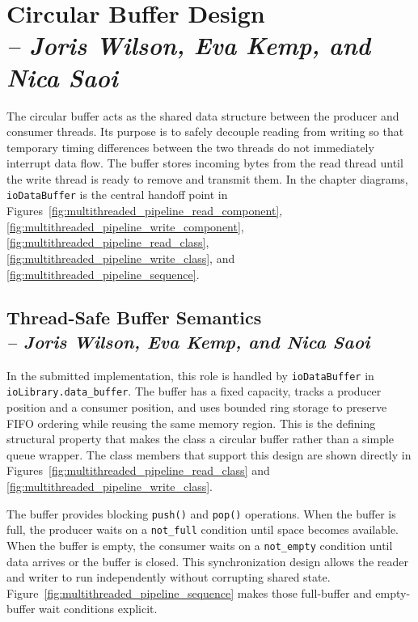 \section{Circular Buffer Design \\
\small{\textit{-- Joris Wilson, Eva Kemp, and Nica Saoi}}}
\label{Section::Circular Buffer Design}

The circular buffer acts as the shared data structure between the producer and consumer threads. Its purpose is to safely decouple reading from writing so that temporary timing differences between the two threads do not immediately interrupt data flow. The buffer stores incoming bytes from the read thread until the write thread is ready to remove and transmit them. In the chapter diagrams, \texttt{ioDataBuffer} is the central handoff point in Figures~\ref{fig:multithreaded_pipeline_read_component}, \ref{fig:multithreaded_pipeline_write_component}, \ref{fig:multithreaded_pipeline_read_class}, \ref{fig:multithreaded_pipeline_write_class}, and \ref{fig:multithreaded_pipeline_sequence}.

\subsection{Thread-Safe Buffer Semantics \\
\small{\textit{-- Joris Wilson, Eva Kemp, and Nica Saoi}}}
\label{Section::Thread-Safe Buffer Semantics}

In the submitted implementation, this role is handled by \texttt{ioDataBuffer} in \texttt{ioLibrary.data\_buffer}. The buffer has a fixed capacity, tracks a producer position and a consumer position, and uses bounded ring storage to preserve FIFO ordering while reusing the same memory region. This is the defining structural property that makes the class a circular buffer rather than a simple queue wrapper. The class members that support this design are shown directly in Figures~\ref{fig:multithreaded_pipeline_read_class} and \ref{fig:multithreaded_pipeline_write_class}.

The buffer provides blocking \texttt{push()} and \texttt{pop()} operations. When the buffer is full, the producer waits on a \texttt{not\_full} condition until space becomes available. When the buffer is empty, the consumer waits on a \texttt{not\_empty} condition until data arrives or the buffer is closed. This synchronization design allows the reader and writer to run independently without corrupting shared state. Figure~\ref{fig:multithreaded_pipeline_sequence} makes those full-buffer and empty-buffer wait conditions explicit.

